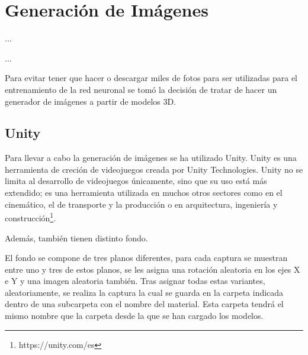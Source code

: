 %
%

\chapter{Generación de Imágenes}

\begin{FraseCelebre}
\begin{Frase}
...
\end{Frase}
\begin{Fuente}
...
\end{Fuente}
\end{FraseCelebre}

\begin{resumen}
Para evitar tener que hacer o descargar miles de fotos para ser utilizadas para el entrenamiento de la red neuronal se tomó la decisión de tratar de hacer un generador de imágenes a partir de modelos 3D.
\end{resumen}


\section{Unity}
\label{cap3:sec:unity}

Para llevar a cabo la generación de imágenes se ha utilizado Unity.
Unity es una herramienta de creción de videojuegos creada por Unity Technologies. Unity no se limita al desarrollo de videojuegos únicamente, sino que su uso está más extendido; es una herramienta utilizada en muchos otros sectores como en el cinemático, el de transporte y la producción o en arquitectura, ingeniería y construcción\footnote{https://unity.com/es}.



Además, también tienen distinto fondo.

El fondo se compone de tres planos diferentes, para cada captura se muestran entre uno y tres de estos planos, se les asigna una rotación aleatoria en los ejes X e Y y una imagen aleatoria también. Tras asignar todas estas variantes, aleatoriamente, se realiza la captura la cual se guarda en la carpeta indicada dentro de una subcarpeta con el nombre del material. Esta carpeta tendrá el mismo nombre que la carpeta desde la que se han cargado los modelos. 

